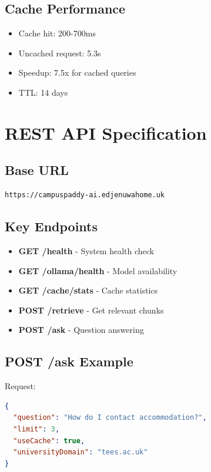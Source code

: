 \documentclass[12pt]{article}
\begin{document}
\subsection{Cache Performance}

\begin{itemize}
    \item Cache hit: 200-700ms
    \item Uncached request: 5.3s
    \item Speedup: 7.5x for cached queries
    \item TTL: 14 days
\end{itemize}

\section{REST API Specification}

\subsection{Base URL}

\begin{lstlisting}
https://campuspaddy-ai.edjenuwahome.uk
\end{lstlisting}

\subsection{Key Endpoints}

\begin{itemize}
    \item \textbf{GET /health} - System health check
    \item \textbf{GET /ollama/health} - Model availability
    \item \textbf{GET /cache/stats} - Cache statistics
    \item \textbf{POST /retrieve} - Get relevant chunks
    \item \textbf{POST /ask} - Question answering
\end{itemize}

\subsection{POST /ask Example}

Request:
\begin{lstlisting}[language=json]
{
  "question": "How do I contact accommodation?",
  "limit": 3,
  "useCache": true,
  "universityDomain": "tees.ac.uk"
}
\end{lstlisting}
\end{document}
